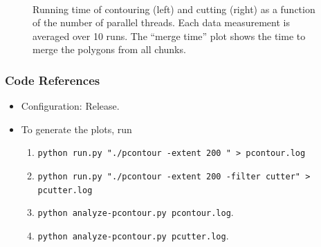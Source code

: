 \documentclass{article}
\begin{document}
\begin{figure}[H]
\centering \mbox{
  \quad {}
}
\caption{Running time of contouring (left) and cutting (right) as a function of the
  number of parallel threads. Each data measurement is averaged over
  10 runs. The ``merge time'' plot shows the time to merge the
  polygons from all chunks.}
\label{fig:contour}
\end{figure}

\subsubsection*{Code References}
\begin{itemize}
\item Configuration: Release.
\item To generate the plots, run
\begin{enumerate}
\item {\tt python run.py "./pcontour -extent 200 " > pcontour.log}
\item {\tt python run.py "./pcontour -extent 200 -filter cutter" > pcutter.log}
\item {\tt python analyze-pcontour.py pcontour.log}.
\item {\tt python analyze-pcontour.py pcutter.log}.
\end{enumerate}
\end{itemize}
\end{document}

